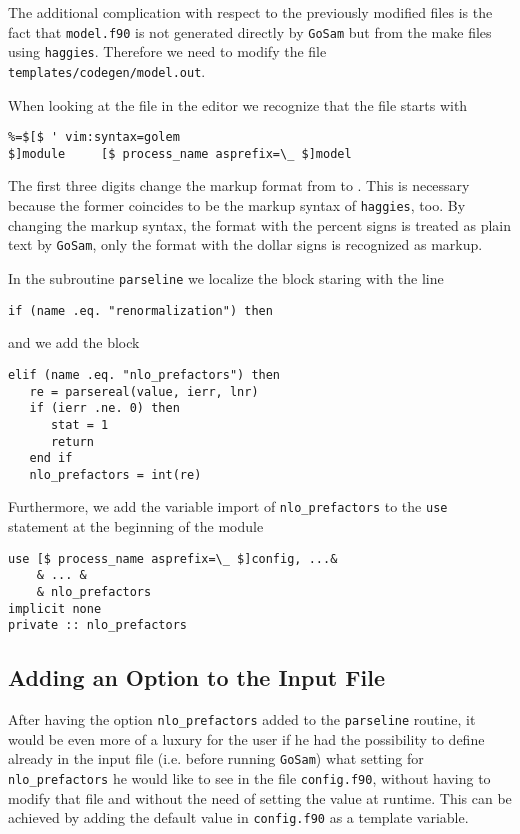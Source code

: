 \documentclass[11pt,a4paper]{refrep}
\newcommand{\golem}{{\tt GoSam}\xspace}
\newcommand{\haggies}{{\tt haggies}\xspace}
\begin{document}
The additional complication with respect to the previously modified
files is the fact that \texttt{model.f90} is not generated directly
by \golem{} but from the make files using \haggies{}. Therefore we
need to modify the file
\texttt{templates/\hspace{0pt}codegen\hspace{0pt}/model.out}.

When looking at the file in the editor we recognize that the file
starts with
\begin{lstlisting}
%=$[$ ' vim:syntax=golem
$]module     [$ process_name asprefix=\_ $]model
\end{lstlisting}
The first three digits \lit{\%=\$} change the markup format from
\lit{[\% ... \%]} to \lit{[\$ ... \$]}. This is necessary because
the former coincides to be the markup syntax of \haggies{}, too.
By changing the markup syntax, the format with the percent signs
is treated as plain text by \golem{}, only the format with the
dollar signs is recognized as markup.

In the subroutine \texttt{parseline} we localize the block staring
with the line
\begin{lstlisting}
if (name .eq. "renormalization") then
\end{lstlisting}
and we add the block
\begin{lstlisting}
elif (name .eq. "nlo_prefactors") then
   re = parsereal(value, ierr, lnr)
   if (ierr .ne. 0) then
      stat = 1
      return
   end if
   nlo_prefactors = int(re)
\end{lstlisting}

Furthermore, we add the variable import of \texttt{nlo\_prefactors}
to the \texttt{use} statement at the beginning of the module
\begin{lstlisting}
use [$ process_name asprefix=\_ $]config, ...&
    & ... &
    & nlo_prefactors
implicit none
private :: nlo_prefactors
\end{lstlisting}

\subsection{Adding an Option to the Input File}
\label{ssec:nlo-prefactors:03}
After having the option \texttt{nlo\_prefactors} added to the
\texttt{parseline} routine,
it would be even more of a luxury for the user if he had the possibility
to define already in the input file (i.e. before running \golem{}) what
setting for \texttt{nlo\_prefactors} he would like to see in the file
\texttt{config.f90}, without having to modify that file and without the
need of setting the value at runtime. This can be achieved by adding
the default value in \texttt{config.f90} as a template variable.
\end{document}
